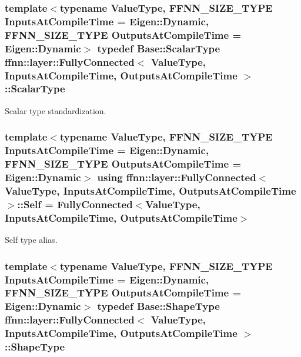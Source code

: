 \hypertarget{classffnn_1_1layer_1_1_fully_connected_ac3ff6f72846f84f89c0d6e10f138c7e3}{
\subsubsection[{Scalar\-Type}]{\setlength{\rightskip}{0pt plus 5cm}template$<$typename Value\-Type, F\-F\-N\-N\-\_\-\-S\-I\-Z\-E\-\_\-\-T\-Y\-P\-E Inputs\-At\-Compile\-Time = Eigen\-::\-Dynamic, F\-F\-N\-N\-\_\-\-S\-I\-Z\-E\-\_\-\-T\-Y\-P\-E Outputs\-At\-Compile\-Time = Eigen\-::\-Dynamic$>$ typedef {\bf Base\-::\-Scalar\-Type} {\bf ffnn\-::layer\-::\-Fully\-Connected}$<$ Value\-Type, Inputs\-At\-Compile\-Time, Outputs\-At\-Compile\-Time $>$\-::{\bf Scalar\-Type}}}\label{classffnn_1_1layer_1_1_fully_connected_ac3ff6f72846f84f89c0d6e10f138c7e3}


Scalar type standardization. 

\hypertarget{classffnn_1_1layer_1_1_fully_connected_a34f862e03a4a2d070013c6c732563a5f}{
\subsubsection[{Self}]{\setlength{\rightskip}{0pt plus 5cm}template$<$typename Value\-Type, F\-F\-N\-N\-\_\-\-S\-I\-Z\-E\-\_\-\-T\-Y\-P\-E Inputs\-At\-Compile\-Time = Eigen\-::\-Dynamic, F\-F\-N\-N\-\_\-\-S\-I\-Z\-E\-\_\-\-T\-Y\-P\-E Outputs\-At\-Compile\-Time = Eigen\-::\-Dynamic$>$ using {\bf ffnn\-::layer\-::\-Fully\-Connected}$<$ Value\-Type, Inputs\-At\-Compile\-Time, Outputs\-At\-Compile\-Time $>$\-::{\bf Self} =  {\bf Fully\-Connected}$<$Value\-Type, Inputs\-At\-Compile\-Time, Outputs\-At\-Compile\-Time$>$}}\label{classffnn_1_1layer_1_1_fully_connected_a34f862e03a4a2d070013c6c732563a5f}


Self type alias. 

\hypertarget{classffnn_1_1layer_1_1_fully_connected_a6087b3dca79894a83be146674d5eb99e}{
\subsubsection[{Shape\-Type}]{\setlength{\rightskip}{0pt plus 5cm}template$<$typename Value\-Type, F\-F\-N\-N\-\_\-\-S\-I\-Z\-E\-\_\-\-T\-Y\-P\-E Inputs\-At\-Compile\-Time = Eigen\-::\-Dynamic, F\-F\-N\-N\-\_\-\-S\-I\-Z\-E\-\_\-\-T\-Y\-P\-E Outputs\-At\-Compile\-Time = Eigen\-::\-Dynamic$>$ typedef {\bf Base\-::\-Shape\-Type} {\bf ffnn\-::layer\-::\-Fully\-Connected}$<$ Value\-Type, Inputs\-At\-Compile\-Time, Outputs\-At\-Compile\-Time $>$\-::{\bf Shape\-Type}}}\label{classffnn_1_1layer_1_1_fully_connected_a6087b3dca79894a83be146674d5eb99e}


